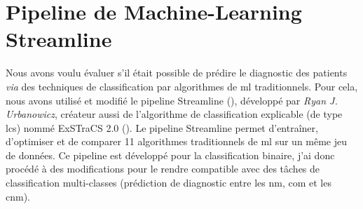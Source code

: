 \section{Pipeline de Machine-Learning Streamline}
Nous avons voulu évaluer s'il était possible de prédire le diagnostic des patients \textit{via} des techniques de classification par algorithmes de \gls{ml} traditionnels. Pour cela, nous avons utilisé et modifié le pipeline Streamline (\cite{urbanowicz_streamline_2023}), développé par \textit{Ryan J. Urbanowicz}, créateur aussi de l'algorithme de classification explicable (de type \gls{lcs})  nommé ExSTraCS 2.0 (\cite{urbanowicz_exstracs_2015}).
Le pipeline Streamline permet d'entraîner, d'optimiser et de comparer 11 algorithmes traditionnels de \gls{ml} sur un même jeu de données. Ce pipeline est développé pour la classification binaire, j'ai donc procédé à des modifications pour le rendre compatible avec des tâches de classification multi-classes (prédiction de diagnostic entre les \gls{nm}, \gls{com} et les \gls{cnm}).
